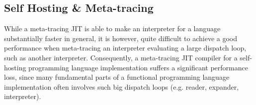\subsection{Self Hosting \& Meta-tracing}
\label{subsec:self-hosting-problem}

While a meta-tracing JIT is able to make an interpreter for a language
substantially faster in general, it is however, quite difficult to
achieve a good performance when meta-tracing an interpreter evaluating
a large dispatch loop, such as another interpreter. Consequently, a
meta-tracing JIT compiler for a self-hosting programming language
implementation suffers a significant performance loss, since many
fundamental parts of a functional programming language implementation
often involves such big dispatch loops (e.g. reader, expander,
interpreter).
